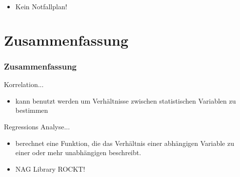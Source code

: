 \documentclass{beamer}
\begin{document}
\begin{frame}

 \begin{itemize}
  \item<5> Kein Notfallplan!
 \end{itemize}

\end{frame}


\section{Zusammenfassung}

\begin{frame}
 \frametitle{Zusammenfassung}
 
 \begin{block}{Korrelation...}
  \begin{itemize}
   \item kann benutzt werden um Verh\"altnisse zwischen statistischen Variablen zu bestimmen
  \end{itemize}
 \end{block}

 \begin{block}{Regressions Analyse...}
  \begin{itemize}
   \item berechnet eine Funktion, die das Verh\"altnis einer abh\"angigen Variable zu einer oder mehr unabh\"angigen beschreibt.
  \end{itemize}
 \end{block}

 \begin{itemize}
  \item NAG Library ROCKT!
 \end{itemize}

\end{frame}
\end{document}
